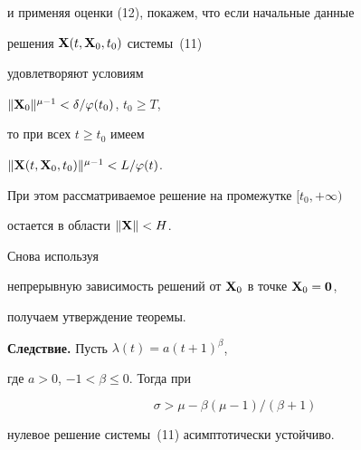 \begin{pf}
и применяя оценки (12), покажем, что если начальные данные


решения $\bold X(t,\bold X_0,t_0)$ системы~(11)


удовлетворяют условиям 


$\|\bold X_0\|^{\mu-1}<\delta/\varphi(t_0)$, $t_0\geq T$,


то при всех $t\geq t_0$ имеем


$\|\bold X(t,\bold X_0,t_0)\|^{\mu-1}<L/\varphi(t)$.


При этом рассматриваемое решение на промежутке $[t_0, +\infty)$


остается в области $\|\bold X\| < H$.





Снова используя


непрерывную зависимость решений от $\bold X_0$ в точке $\bold X_0=\bold 0$,


получаем утверждение теоремы.


\end{pf}





{\bf Следствие.} Пусть $\lambda(t)=a(t+1)^\beta$,


где $a>0$, $-1<\beta\leq 0$. Тогда при


\begin{equation}


\sigma> \mu-\beta(\mu-1)/(\beta+1)


\end{equation}


нулевое решение системы~(11) асимптотически устойчиво.






